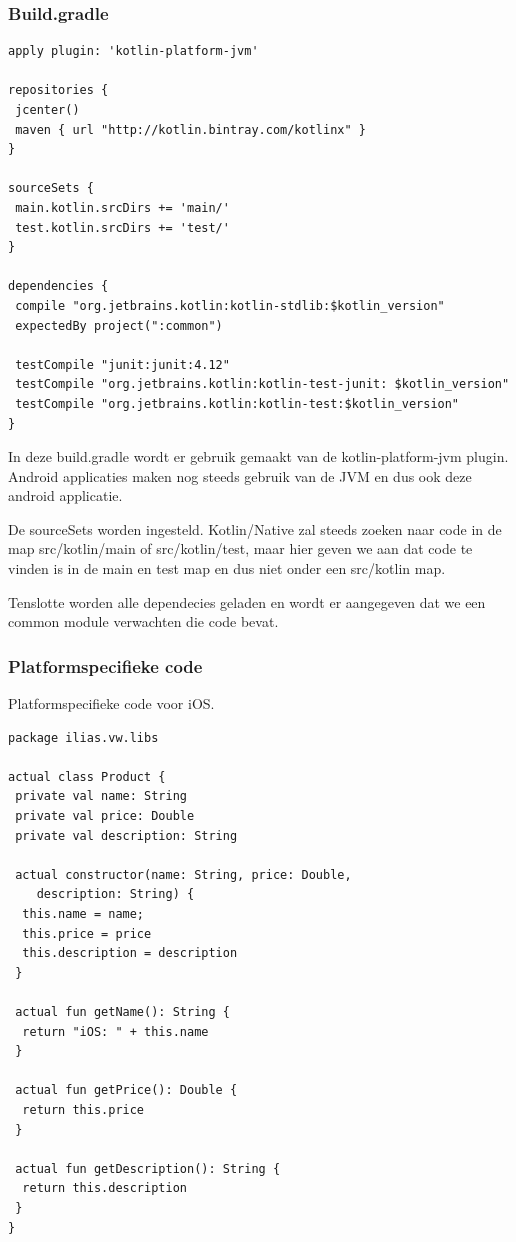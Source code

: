 \subsubsection{Build.gradle}
\begin{lstlisting}
apply plugin: 'kotlin-platform-jvm'

repositories {
 jcenter()
 maven { url "http://kotlin.bintray.com/kotlinx" }
}

sourceSets {
 main.kotlin.srcDirs += 'main/'
 test.kotlin.srcDirs += 'test/'
}

dependencies {
 compile "org.jetbrains.kotlin:kotlin-stdlib:$kotlin_version"
 expectedBy project(":common")

 testCompile "junit:junit:4.12"
 testCompile "org.jetbrains.kotlin:kotlin-test-junit: $kotlin_version"
 testCompile "org.jetbrains.kotlin:kotlin-test:$kotlin_version"
}
\end{lstlisting}

In deze build.gradle wordt er gebruik gemaakt van de kotlin-platform-jvm plugin. Android applicaties maken nog steeds gebruik van de JVM en dus ook deze android applicatie. 

De sourceSets worden ingesteld. Kotlin/Native zal steeds zoeken naar code in de map src/kotlin/main of src/kotlin/test, maar hier geven we aan dat code te vinden is in de main en test map en dus niet onder een src/kotlin map.

Tenslotte worden alle dependecies geladen en wordt er aangegeven dat we een common module verwachten die code bevat.

\subsubsection{Platformspecifieke code}
Platformspecifieke code voor iOS.
\begin{lstlisting}
package ilias.vw.libs

actual class Product {
 private val name: String
 private val price: Double
 private val description: String

 actual constructor(name: String, price: Double, 
 	description: String) {
  this.name = name;
  this.price = price
  this.description = description
 }

 actual fun getName(): String {
  return "iOS: " + this.name
 }

 actual fun getPrice(): Double {
  return this.price
 }

 actual fun getDescription(): String {
  return this.description
 }
}
\end{lstlisting}

